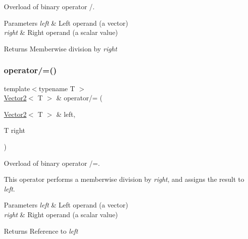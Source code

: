 Overload of binary operator /. 


\begin{DoxyParams}{Parameters}
{\em left} & Left operand (a vector) \\
\hline
{\em right} & Right operand (a scalar value)\\
\hline
\end{DoxyParams}
\begin{DoxyReturn}{Returns}
Memberwise division by {\itshape right} \begin{DoxyVerb}\end{DoxyVerb}
 
\end{DoxyReturn}
\mbox{\label{classsf_1_1_vector2_ac4d293c9dc7954ccfd5e373972f38b03}} 
\subsubsection{\texorpdfstring{operator/=()}{operator/=()}}
{\footnotesize\ttfamily template$<$typename T $>$ \\
\mbox{\hyperlink{classsf_1_1_vector2}{Vector2}}$<$ T $>$ \& operator/= (\begin{DoxyParamCaption}\item[{\mbox{\hyperlink{classsf_1_1_vector2}{Vector2}}$<$ T $>$ \&}]{left,  }\item[{T}]{right }\end{DoxyParamCaption})\hspace{0.3cm}{\ttfamily [related]}}



Overload of binary operator /=. 

This operator performs a memberwise division by {\itshape right}, and assigns the result to {\itshape left}.


\begin{DoxyParams}{Parameters}
{\em left} & Left operand (a vector) \\
\hline
{\em right} & Right operand (a scalar value)\\
\hline
\end{DoxyParams}
\begin{DoxyReturn}{Returns}
Reference to {\itshape left} \begin{DoxyVerb}\end{DoxyVerb}
 
\end{DoxyReturn}
\mbox{\label{classsf_1_1_vector2_a9a7b2d36c3850828fdb651facfd25136}} 
